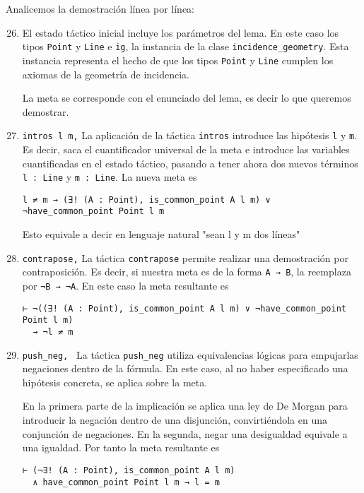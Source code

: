 Analicemos la demostración línea por línea:
\begin{enumerate}[label=L.\arabic*, topsep=0mm]
	\setcounter{enumi}{25}

	\item El estado táctico inicial incluye los parámetros del lema. En este caso
	      los tipos \lstinline{Point} y \lstinline{Line} e \lstinline{ig}, la
	      instancia de la clase \lstinline{incidence_geometry}. Esta instancia
	      representa el hecho de que los tipos \lstinline{Point} y \lstinline{Line}
	      cumplen los axiomas de la geometría de incidencia.

	      La meta se corresponde con el enunciado del lema, es decir lo que queremos
	      demostrar.


	\item \lstinline{intros l m,} La aplicación de la táctica \lstinline{intros}
	      introduce las hipótesis \lstinline{l} y \lstinline{m}. Es decir, saca el
	      cuantificador universal de la meta e introduce las variables cuantificadas
	      en el estado táctico, pasando a tener ahora dos nuevos términos
	      \lstinline{l : Line} y \lstinline{m : Line}. La nueva meta es
	      \begin{lstlisting}
l ≠ m → (∃! (A : Point), is_common_point A l m) ∨ ¬have_common_point Point l m
\end{lstlisting}
	      Esto equivale a decir en lenguaje natural "sean l y m dos líneas"

	\item \lstinline{contrapose,} La táctica \lstinline{contrapose} permite
	      realizar una demostración por contraposición. Es decir, si nuestra meta es
	      de la forma \lstinline{A → B}, la reemplaza por \lstinline{¬B → ¬A}. En
	      este caso la meta resultante es
	      \begin{lstlisting}
⊢ ¬((∃! (A : Point), is_common_point A l m) ∨ ¬have_common_point Point l m) 
  → ¬l ≠ m
\end{lstlisting}

	\item \lstinline{push_neg, } La táctica \lstinline{push_neg} utiliza
	      equivalencias lógicas para \guillemotleft empujar\guillemotright las negaciones dentro de la fórmula.
	      En este caso, al no haber especificado una hipótesis concreta, se aplica
	      sobre la meta.

	      En la primera parte de la implicación se aplica una ley de De Morgan para
	      introducir la negación dentro de una disjunción, convirtiéndola en una
	      conjunción de negaciones. En la segunda, negar una desigualdad equivale a
	      una igualdad. Por tanto la meta resultante es
	      \begin{lstlisting}
⊢ (¬∃! (A : Point), is_common_point A l m) 
  ∧ have_common_point Point l m → l = m
\end{lstlisting}


\end{enumerate}
